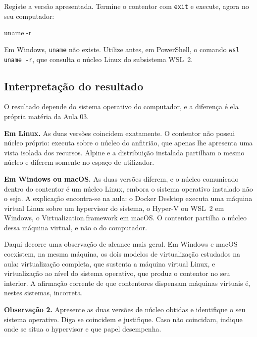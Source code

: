 \documentclass[11pt,a4paper]{article}
\begin{document}
Registe a versão apresentada. Termine o contentor com \texttt{exit} e execute, agora no seu computador:

\begin{terminal}
uname -r
\end{terminal}

\begin{atencao}
Em Windows, \texttt{uname} não existe. Utilize antes, em PowerShell, o comando \texttt{wsl uname -r}, que consulta o núcleo Linux do subsistema WSL~2.
\end{atencao}

\subsection{Interpretação do resultado}

O resultado depende do sistema operativo do computador, e a diferença é ela própria matéria da Aula 03.

\textbf{Em Linux.} As duas versões coincidem exatamente. O contentor não possui núcleo próprio: executa sobre o núcleo do anfitrião, que apenas lhe apresenta uma vista isolada dos recursos. Alpine e a distribuição instalada partilham o mesmo núcleo e diferem somente no espaço de utilizador.

\textbf{Em Windows ou macOS.} As duas versões diferem, e o núcleo comunicado dentro do contentor é um núcleo Linux, embora o sistema operativo instalado não o seja. A explicação encontra-se na aula: o Docker Desktop executa uma máquina virtual Linux sobre um hypervisor do sistema, o Hyper-V ou WSL~2 em Windows, o Virtualization.framework em macOS. O contentor partilha o núcleo dessa máquina virtual, e não o do computador.

\begin{nota}
Daqui decorre uma observação de alcance mais geral. Em Windows e macOS coexistem, na mesma máquina, os dois modelos de virtualização estudados na aula: virtualização completa, que sustenta a máquina virtual Linux, e virtualização ao nível do sistema operativo, que produz o contentor no seu interior. A afirmação corrente de que contentores dispensam máquinas virtuais é, nestes sistemas, incorreta.
\end{nota}

\begin{registo}
\textbf{Observação 2.} Apresente as duas versões de núcleo obtidas e identifique o seu sistema operativo. Diga se coincidem e justifique. Caso não coincidam, indique onde se situa o hypervisor e que papel desempenha.
\end{registo}
\end{document}
